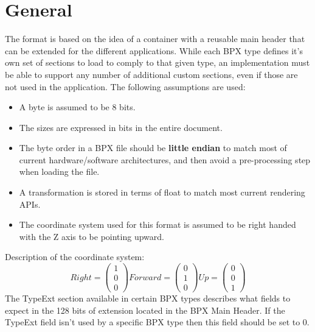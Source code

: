 \section{General}
The format is based on the idea of a container with a reusable main header that can be extended for the different applications. While each BPX type defines it's own set of sections to load to comply to that given type, an implementation must be able to support any number of additional custom sections, even if those are not used in the application.\newline
The following assumptions are used:
\begin{itemize}
    \item A byte is assumed to be 8 bits.
    \item The sizes are expressed in bits in the entire document.
    \item The byte order in a BPX file should be \textbf{little endian} to match most of current hardware/software architectures, and then avoid a pre-processing step when loading the file.
    \item A transformation is stored in terms of float to match most current rendering APIs.
    \item The coordinate system used for this format is assumed to be right handed with the Z axis to be pointing upward.
\end{itemize}
Description of the coordinate system:
\begin{equation}
    Right =
    \begin{pmatrix}
        1 \\
        0 \\
        0
    \end{pmatrix}
    Forward =
    \begin{pmatrix}
        0 \\
        1 \\
        0
    \end{pmatrix}
    Up =
    \begin{pmatrix}
        0 \\
        0 \\
        1
    \end{pmatrix}
\end{equation}
The TypeExt section available in certain BPX types describes what fields to expect in the 128 bits of extension located in the BPX Main Header.\newline
If the TypeExt field isn't used by a specific BPX type then this field should be set to 0.

